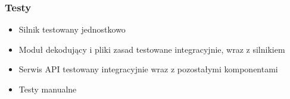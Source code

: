 \documentclass{beamer}
\begin{document}
\begin{frame}[noframenumbering]
	\frametitle{Testy}
	\begin{itemize}
		\item Silnik testowany jednostkowo
		\item Moduł dekodujący i pliki zasad testowane integracyjnie, wraz z silnikiem
		\item Serwis API testowany integracyjnie wraz z pozostałymi komponentami
		\item Testy manualne
	\end{itemize}
\end{frame}
\end{document}
